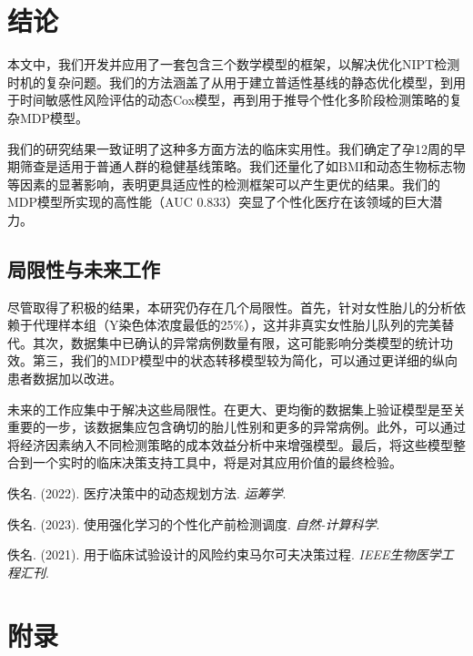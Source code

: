 \documentclass[UTF8, a4paper, 11pt]{ctexart}
\begin{document}
\section{结论}
本文中，我们开发并应用了一套包含三个数学模型的框架，以解决优化NIPT检测时机的复杂问题。我们的方法涵盖了从用于建立普适性基线的静态优化模型，到用于时间敏感性风险评估的动态Cox模型，再到用于推导个性化多阶段检测策略的复杂MDP模型。

我们的研究结果一致证明了这种多方面方法的临床实用性。我们确定了孕12周的早期筛查是适用于普通人群的稳健基线策略。我们还量化了如BMI和动态生物标志物等因素的显著影响，表明更具适应性的检测框架可以产生更优的结果。我们的MDP模型所实现的高性能（AUC 0.833）突显了个性化医疗在该领域的巨大潜力。

\subsection{局限性与未来工作}
尽管取得了积极的结果，本研究仍存在几个局限性。首先，针对女性胎儿的分析依赖于代理样本组（Y染色体浓度最低的25\%），这并非真实女性胎儿队列的完美替代。其次，数据集中已确认的异常病例数量有限，这可能影响分类模型的统计功效。第三，我们的MDP模型中的状态转移模型较为简化，可以通过更详细的纵向患者数据加以改进。

未来的工作应集中于解决这些局限性。在更大、更均衡的数据集上验证模型是至关重要的一步，该数据集应包含确切的胎儿性别和更多的异常病例。此外，可以通过将经济因素纳入不同检测策略的成本效益分析中来增强模型。最后，将这些模型整合到一个实时的临床决策支持工具中，将是对其应用价值的最终检验。

\begin{thebibliography}{9}
佚名. (2022). 医疗决策中的动态规划方法. \textit{运筹学}.

佚名. (2023). 使用强化学习的个性化产前检测调度. \textit{自然-计算科学}.

佚名. (2021). 用于临床试验设计的风险约束马尔可夫决策过程. \textit{IEEE生物医学工程汇刊}.

\end{thebibliography}

\newpage
\appendix
\section{附录}
\end{document}
